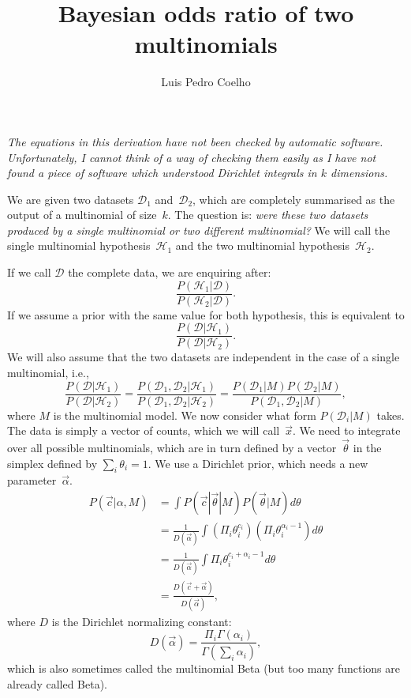 \documentclass{article}
\let\product\Pi
\begin{document}
\title{Bayesian odds ratio of two multinomials}
\author{Luis Pedro Coelho}
\maketitle

\emph{The equations in this derivation have not been checked by automatic
software. Unfortunately, I cannot think of a way of checking them easily as I
have not found a piece of software which understood Dirichlet integrals in $k$
dimensions.}

\bigbreak

We are given two datasets $\mathcal{D}_1$ and~$\mathcal{D}_2$, which are
completely summarised as the output of a multinomial of size~$k$. The question
is: \emph{were these two datasets produced by a single multinomial or two
different multinomial?} We will call the single multinomial
hypothesis~$\mathcal{H}_1$ and the two multinomial hypothesis~$\mathcal{H}_2$.

If we call $\mathcal{D}$ the complete data, we are enquiring after:
\begin{equation}
\frac{P(\mathcal{H}_1|\mathcal{D})}{P(\mathcal{H}_2|\mathcal{D})}.
\label{eq:odds}
\end{equation}
If we assume a prior with the same value for both hypothesis, this is equivalent to
\begin{equation}
\frac{P(\mathcal{D}|\mathcal{H}_1)}{P(\mathcal{D}|\mathcal{H}_2)}.
\label{eq:odds-reversed}
\end{equation}
We will also assume that the two datasets are independent in the case of a single multinomial, i.e.,
\begin{equation}
\frac{P(\mathcal{D}|\mathcal{H}_1)}{P(\mathcal{D}|\mathcal{H}_2)} =
\frac{P(\mathcal{D}_1,\mathcal{D}_2|\mathcal{H}_1)}{P(\mathcal{D}_1,\mathcal{D}_2|\mathcal{H}_2)} =
\frac{P(\mathcal{D}_1|M)P(\mathcal{D}_2|M)}{P(\mathcal{D}_1,\mathcal{D}_2|M)},
\label{eq:p1p2-overp12}
\end{equation}
where $M$ is the multinomial model. We now consider what form
$P(\mathcal{D}_i|M)$ takes. The data is simply a vector of counts, which we
will call~$\vec x$. We need to integrate over all possible multinomials, which
are in turn defined by a vector~$\vec\theta$ in the simplex defined by $\sum_i
\theta_i = 1$. We use a Dirichlet prior, which needs a new parameter~$\vec\alpha$.
\begin{align}
P(\vec{c}|\alpha,M)
    &= \int P(\vec{c}|\vec{\theta}|M)P(\vec{\theta}|M) d\theta \\
    &= \frac{1}{D(\vec{\alpha})}{\int (\product_i \theta_i^{c_i})(\product_i \theta_i^{\alpha_i-1}) d\theta} \\
    &= \frac{1}{D(\vec{\alpha})}{\int \product_i \theta_i^{c_i + \alpha_i - 1} d\theta} \\
    &= \frac{D(\vec{c} + \vec{\alpha})}{D(\vec{\alpha})},
\end{align}
where $D$ is the Dirichlet normalizing constant:
\begin{equation}
D(\vec{\alpha}) = \frac{\product_i \Gamma(\alpha_i)}{\Gamma(\sum_i \alpha_i)},
\end{equation}
which is also sometimes called the multinomial Beta (but too many functions are
already called Beta).
\end{document}
